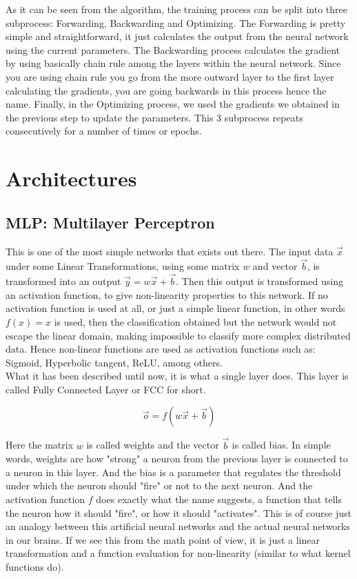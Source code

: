 \documentclass[english,preprint,JIP]{ipsj}
\begin{document}
As it can be seen from the algorithm, the training process can be split into
three subprocess: Forwarding, Backwarding and Optimizing. The Forwarding is
pretty simple and straightforward, it just calculates the output from the neural
network using the current parameters. The Backwarding process calculates the
gradient by using basically chain rule among the layers within the neural
network. Since you are using chain rule you go from the more outward layer to
the first layer calculating the gradients, you are going backwards in this
process hence the name. Finally, in the Optimizing process, we used the
gradients we obtained in the previous step to update the parameters. This 3
subprocess repeats consecutively for a number of times or epochs.\\

\section{Architectures}
\subsection{MLP: Multilayer Perceptron}
This is one of the most simple networks that exists out there. The input data
$\vec{x}$ under some Linear Transformations, using some matrix $w$ and vector
$\vec{b}$, is transformed into an output $\vec{y} = w\vec{x} + \vec{b}$. Then
this output is transformed using an activation function, to give non-linearity
properties to this network. If no activation function is used at all, or just a
simple linear function, in other words $f(x) = x$ is used, then the
classification obtained but the network would not escape the linear domain,
making impossible to classify more complex distributed data. Hence non-linear
functions are used as activation functions such as: Sigmoid, Hyperbolic tangent,
ReLU, among others.\\

What it has been described until now, it is what a single layer does. This layer
is called Fully Connected Layer or FCC for short.

\begin{equation}
    \vec{o} = f(w\vec{x} + \vec{b})
\end{equation}

Here the matrix $w$ is called weights and the vector $\vec{b}$ is called bias.
In simple words, weights are how "strong" a neuron from the previous layer is
connected to a neuron in this layer. And the bias is a parameter that regulates
the threshold under which the neuron should "fire" or not to the next neuron.
And the activation function $f$ does exactly what the name suggests, a function
that tells the neuron how it should "fire", or how it should "activates". This
is of course just an analogy between this artificial neural networks and the
actual neural networks in our brains. If we see this from the math point of
view, it is just a linear transformation and a function evaluation for
non-linearity (similar to what kernel functions do).\\
\end{document}
